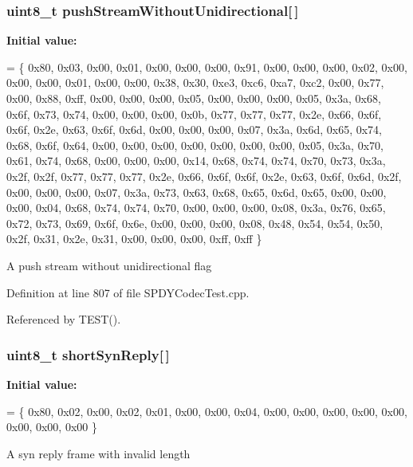 \subsubsection[{push\+Stream\+Without\+Unidirectional}]{\setlength{\rightskip}{0pt plus 5cm}uint8\+\_\+t push\+Stream\+Without\+Unidirectional[$\,$]}\label{SPDYCodecTest_8cpp_ab4cb6d938e2a873e310c486c0cee91b5}
{\bfseries Initial value\+:}
\begin{DoxyCode}
=
\{ 0x80, 0x03, 0x00, 0x01, 0x00, 0x00, 0x00, 0x91,
  0x00, 0x00, 0x00, 0x02, 0x00, 0x00, 0x00, 0x01,
  0x00, 0x00, 0x38, 0x30, 0xe3, 0xc6, 0xa7, 0xc2,
  0x00, 0x77, 0x00, 0x88, 0xff, 0x00, 0x00, 0x00,
  0x05, 0x00, 0x00, 0x00, 0x05, 0x3a, 0x68, 0x6f,
  0x73, 0x74, 0x00, 0x00, 0x00, 0x0b, 0x77, 0x77,
  0x77, 0x2e, 0x66, 0x6f, 0x6f, 0x2e, 0x63, 0x6f,
  0x6d, 0x00, 0x00, 0x00, 0x07, 0x3a, 0x6d, 0x65,
  0x74, 0x68, 0x6f, 0x64, 0x00, 0x00, 0x00, 0x00,
  0x00, 0x00, 0x00, 0x05, 0x3a, 0x70, 0x61, 0x74,
  0x68, 0x00, 0x00, 0x00, 0x14, 0x68, 0x74, 0x74,
  0x70, 0x73, 0x3a, 0x2f, 0x2f, 0x77, 0x77, 0x77,
  0x2e, 0x66, 0x6f, 0x6f, 0x2e, 0x63, 0x6f, 0x6d,
  0x2f, 0x00, 0x00, 0x00, 0x07, 0x3a, 0x73, 0x63,
  0x68, 0x65, 0x6d, 0x65, 0x00, 0x00, 0x00, 0x04,
  0x68, 0x74, 0x74, 0x70, 0x00, 0x00, 0x00, 0x08,
  0x3a, 0x76, 0x65, 0x72, 0x73, 0x69, 0x6f, 0x6e,
  0x00, 0x00, 0x00, 0x08, 0x48, 0x54, 0x54, 0x50,
  0x2f, 0x31, 0x2e, 0x31, 0x00, 0x00, 0x00, 0xff,
  0xff
\}
\end{DoxyCode}
A push stream without unidirectional flag 

Definition at line 807 of file S\+P\+D\+Y\+Codec\+Test.\+cpp.



Referenced by T\+E\+S\+T().

\subsubsection[{short\+Syn\+Reply}]{\setlength{\rightskip}{0pt plus 5cm}uint8\+\_\+t short\+Syn\+Reply[$\,$]}\label{SPDYCodecTest_8cpp_aaf11c23b1f3ffc803f34c33681037eda}
{\bfseries Initial value\+:}
\begin{DoxyCode}
=
\{ 0x80, 0x02, 0x00, 0x02, 0x01, 0x00, 0x00, 0x04, 
  0x00, 0x00, 0x00, 0x00, 0x00, 0x00, 0x00, 0x00
\}
\end{DoxyCode}
A syn reply frame with invalid length 

